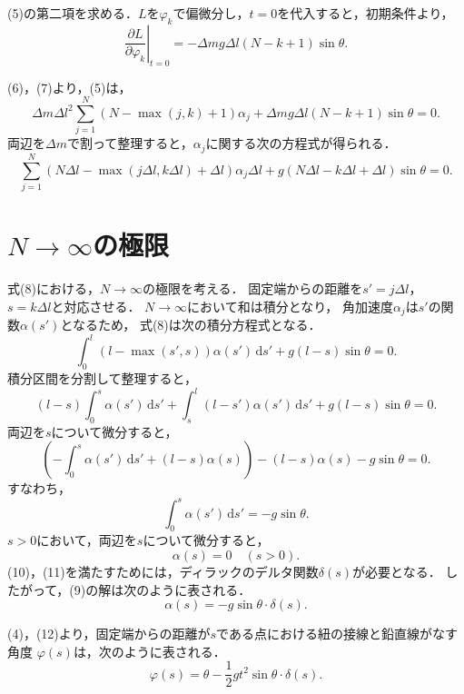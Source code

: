 \documentclass[11pt, a4paper]{ltjsarticle}
\begin{document}
(5)の第二項を求める．$L$を$\varphi_k$で偏微分し，$t = 0$を代入すると，初期条件より，
\begin{equation}
  \left.\frac{\partial L}{\partial \varphi_k}\right|_{t = 0}
  = - \Delta m g \Delta l \left(N - k + 1\right) \sin \theta.
\end{equation}

(6)，(7)より，(5)は，
\begin{equation*}
  \Delta m {\Delta l}^2 \sum_{j = 1}^{N}
  \left(N - \max \left(j, k\right) + 1\right) \alpha_j
  + \Delta m g \Delta l \left(N - k + 1\right) \sin \theta = 0.
\end{equation*}
両辺を$\Delta m$で割って整理すると，$\alpha_j$に関する次の方程式が得られる．
\begin{equation}
  \sum_{j = 1}^{N} \left(N \Delta l
  - \max \left(j \Delta l, k \Delta l\right) + \Delta l\right) \alpha_j
  \Delta l + g \left(N \Delta l - k \Delta l + \Delta l\right) \sin \theta = 0.
\end{equation}

\section{$N\rightarrow\infty$の極限}
式(8)における，$N \rightarrow \infty$の極限を考える．
固定端からの距離を$s' = j \Delta l$，$s = k \Delta l$と対応させる．
$N \rightarrow \infty$において和は積分となり，
角加速度$\alpha_j$は$s'$の関数$\alpha\left(s'\right)$となるため，
式(8)は次の積分方程式となる．
\begin{equation}
  \int_{0}^{l} \left(l - \max \left(s', s\right)\right)
  \alpha\left(s'\right) \,\mathrm{d}s'
  + g \left(l - s\right) \sin \theta = 0. 
\end{equation}
積分区間を分割して整理すると，
\begin{equation*}
  \left(l - s\right) \int_{0}^{s} \alpha\left(s'\right) \,\mathrm{d}s'
  + \int_{s}^{l} \left(l - s'\right) \alpha\left(s'\right) \,\mathrm{d}s'
  + g \left(l - s\right) \sin \theta = 0.
\end{equation*}
両辺を$s$について微分すると，
\begin{equation*}
  \left( - \int_{0}^{s} \alpha\left(s'\right) \,\mathrm{d}s'
  + \left(l - s\right) \alpha\left(s\right) \right)
  - \left(l - s\right) \alpha\left(s\right)
  - g \sin \theta = 0.
\end{equation*}
すなわち，
\begin{equation}
  \int_{0}^{s} \alpha\left(s'\right) \,\mathrm{d}s' = -g \sin \theta.
\end{equation}
$s > 0$において，両辺を$s$について微分すると，
\begin{equation}
  \alpha\left(s\right) = 0 \quad \left(s > 0\right).
\end{equation}
(10)，(11)を満たすためには，ディラックのデルタ関数$\delta \left(s\right)$が必要となる．
したがって，(9)の解は次のように表される．
\begin{equation}
  \alpha\left(s\right) = -g \sin \theta \cdot \delta \left(s\right).
\end{equation}

(4)，(12)より，固定端からの距離が$s$である点における紐の接線と鉛直線がなす角度
$\varphi \left(s\right)$は，次のように表される．
\begin{equation}
  \varphi\left(s\right) = \theta - \frac{1}{2} g t^2 \sin \theta \cdot \delta \left(s\right).
\end{equation}
\end{document}
